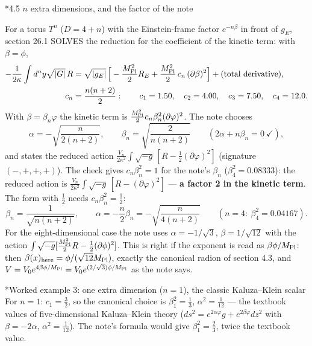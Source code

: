 \documentclass[10pt,a4paper]{article}
\makeatletter
\renewcommand\subsection{\@startsection{subsection}{2}{\z@}{-3.25ex\@plus -1ex \@minus -.2ex}{1.5ex \@plus .2ex}{\normalfont\large\bfseries\raggedright}}
\renewcommand\subsubsection{\@startsection{subsubsection}{3}{\z@}{-3.25ex\@plus -1ex \@minus -.2ex}{1.5ex \@plus .2ex}{\normalfont\normalsize\bfseries\raggedright}}
\makeatother
\begin{document}
\subsection*{4.5 \texorpdfstring{$n$}{n} extra dimensions, and the factor of the note}
For a torus $T^n$ ($D=4+n$) with the Einstein-frame factor $e^{-n\beta}$ in front of $g_E$, section 26.1 SOLVES the reduction for the coefficient of the kinetic term: with $\beta=\phi$,
\begin{align*}
-\frac1{2\kappa}\int d^ny\sqrt{|G|}\,R&=\sqrt{|g_E|}\,\Big[-\frac{M_{\rm Pl}^2}2R_E+\frac{M_{\rm Pl}^2}2\,c_n\,(\partial\beta)^2\Big]+\text{(total derivative)}, \\
c_n&=\frac{n(n+2)}2:\qquad c_1=1.50,\quad c_2=4.00,\quad c_3=7.50,\quad c_4=12.0 .
\end{align*}
With $\beta=\beta_n\varphi$ the kinetic term is $\frac{M_{\rm Pl}^2}2c_n\beta_n^2(\partial\varphi)^2$. The note chooses
\begin{equation*}
\alpha=-\sqrt{\frac n{2(n+2)}},\qquad \beta_n=\sqrt{\frac2{n(n+2)}}\qquad(2\alpha+n\beta_n=0\ \checkmark),
\end{equation*}
and states the reduced action $\frac{V_n}{2\kappa^2}\int\sqrt{-g}\,[R-\frac12(\partial\varphi)^2]$ (signature $(-,+,+,+)$). The check gives $c_n\beta_n^2=1$ for the note’s $\beta_n$ ($\beta_4^2=0.08333$): the reduced action is $\frac{V_n}{2\kappa^2}\int\sqrt{-g}\,[R-(\partial\varphi)^2]$ — \textbf{a factor 2 in the kinetic term}. The form with $\frac12$ needs $c_n\beta_n^2=\frac12$:
\begin{equation*}
\beta_n=\frac1{\sqrt{n(n+2)}},\qquad \alpha=-\frac n2\beta_n=-\sqrt{\frac n{4(n+2)}}\qquad(n=4:\ \beta_4^2=0.04167).
\end{equation*}
For the eight-dimensional case the note uses $\alpha=-1/\sqrt3$, $\beta=1/\sqrt{12}$ with the action $\int\sqrt{-g}[\frac{M_{\rm Pl}^2}2R-\frac12(\partial\phi)^2]$. This is right if the exponent is read as $\beta\phi/M_{\rm Pl}$: then $\beta(x)_{\rm here}=\phi/(\sqrt{12}M_{\rm Pl})$, exactly the canonical radion of section 4.3, and $V=V_0e^{4\beta\phi/M_{\rm Pl}}=V_0e^{(2/\sqrt3)\phi/M_{\rm Pl}}$ as the note says.

\subsubsection*{Worked example 3: one extra dimension (\texorpdfstring{$n=1$}{n=1}), the classic Kaluza–Klein scalar}
For $n=1$: $c_1=\frac32$, so the canonical choice is $\beta_1^2=\frac13$, $\alpha^2=\frac1{12}$ — the textbook values of five-dimensional Kaluza–Klein theory ($ds^2=e^{2\alpha\varphi}g+e^{2\beta\varphi}dz^2$ with $\beta=-2\alpha$, $\alpha^2=\frac1{12}$). The note’s formula would give $\beta_1^2=\frac23$, twice the textbook value.
\end{document}
